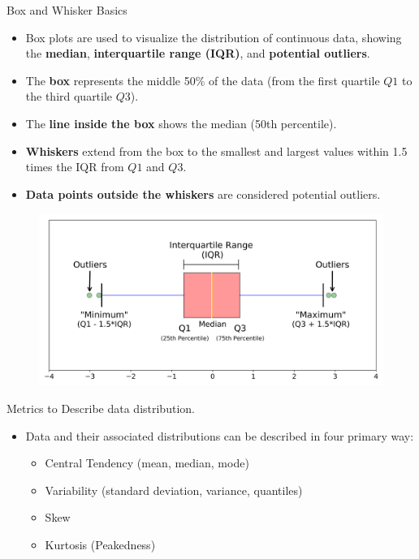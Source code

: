 \documentclass[
  ignorenonframetext,
]{beamer}
\providecommand{\tightlist}{%
  \setlength{\itemsep}{0pt}\setlength{\parskip}{0pt}}
\begin{document}
\begin{frame}{Box and Whisker Basics}
\label{box-and-whisker-basics}
\small

\begin{itemize}
\tightlist
\item
  Box plots are used to visualize the distribution of continuous data,
  showing the \textbf{median}, \textbf{interquartile range (IQR)}, and
  \textbf{potential outliers}.
\item
  The \textbf{box} represents the middle 50\% of the data (from the
  first quartile \(Q1\) to the third quartile \(Q3\)).
\item
  The \textbf{line inside the box} shows the median (50th percentile).
\item
  \textbf{Whiskers} extend from the box to the smallest and largest
  values within 1.5 times the IQR from \(Q1\) and \(Q3\).
\item
  \textbf{Data points outside the whiskers} are considered potential
  outliers. ~
\end{itemize}

\begin{figure}

{\centering \includegraphics[width=0.5\linewidth]{fig/box} 

}

\end{figure}
\end{frame}

\begin{frame}{Metrics to Describe data distribution.}
\label{metrics-to-describe-data-distribution.}
\begin{itemize}
\item
  Data and their associated distributions can be described in four
  primary way:

  \begin{itemize}
  \tightlist
  \item
    Central Tendency (mean, median, mode)
  \item
    Variability (standard deviation, variance, quantiles)
  \item
    Skew
  \item
    Kurtosis (Peakedness)
  \end{itemize}
\end{itemize}
\end{frame}
\end{document}
